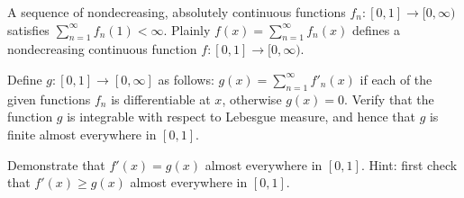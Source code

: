 A sequence of nondecreasing, absolutely continuous functions
$f_n:[0,1]\rightarrow [0,\infty)$ satisfies
$\sum_{n=1}^{\infty}f_n(1)<\infty$. Plainly
$f(x)=\sum_{n=1}^{\infty}f_n(x)$ defines a nondecreasing continuous
function $f:[0,1]\rightarrow [0,\infty)$.
\begin{alist}
\item Define $g:[0,1]\rightarrow [0,\infty]$ as follows:
$g(x)=\sum_{n=1}^{\infty}f'_n(x)$ if each of the given functions $f_n$
is differentiable at $x$, otherwise $g(x)=0$. Verify that the function
$g$ is integrable with respect to Lebesgue measure, and hence that $g$
is finite almost everywhere in $[0,1]$.
\item Demonstrate that $f'(x)=g(x)$ almost everywhere in $[0,1]$.
Hint: first check that $f'(x)\geq g(x)$ almost everywhere in $[0,1]$.
\end{alist}
